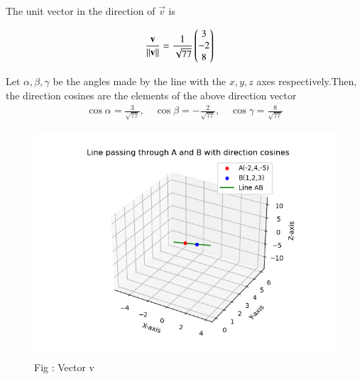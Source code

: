 \documentclass[journal]{IEEEtran}
\begin{document}
The unit vector in the direction of $\vec{v}$ is  

\begin{align*} 
\frac{\mathbf{v}}{\left\lVert\mathbf{v}\right\rVert}
&= \frac{1}{\sqrt{77}}\begin{pmatrix}3 \\ -2 \\ 8\end{pmatrix}
\end{align*}

Let $\alpha,\beta,\gamma$ be the angles made by the line with the $x,y,z$ axes respectively.Then, the direction cosines are the elements of the above direction vector
\begin{align*}
\cos\alpha = \frac{3}{\sqrt{77}}, \quad
\cos\beta = -\frac{2}{\sqrt{77}}, \quad
\cos\gamma = \frac{8}{\sqrt{77}}
\end{align*}

\begin{figure}[h!]
  \centering
  \includegraphics[width=0.9\columnwidth]{figs/fig_vector.png} 
   \caption*{Fig : Vector v}
  \label{Fig1}
\end{figure}
\end{document}

